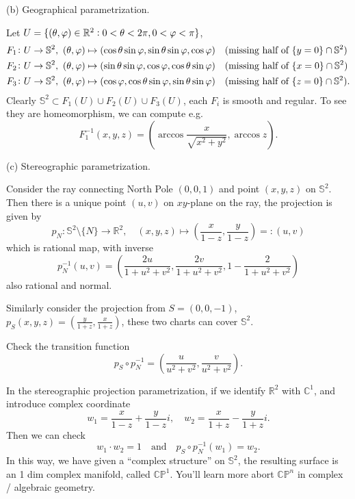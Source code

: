 \noindent (b) Geographical parametrization.

Let \(U=\{(\theta,\varphi)\in \mathbb{R}^2:0<\theta<2\pi,0<\varphi<\pi\}\), 
\begin{align*}
    &F_1\colon U\to \mathbb{S}^2,\ (\theta,\varphi)\mapsto 
    (\cos\theta\sin\varphi,\sin\theta\sin\varphi,\cos\varphi)
    \quad\text{(missing half of }\{y=0\}\cap \mathbb{S}^2\text{)}\\ 
    &F_2\colon U\to \mathbb{S}^2,\ (\theta,\varphi)\mapsto 
    (\sin\theta\sin\varphi,\cos\varphi,\cos\theta\sin\varphi)
    \quad\text{(missing half of }\{x=0\}\cap \mathbb{S}^2\text{)}\\ 
    &F_3\colon U\to \mathbb{S}^2,\ (\theta,\varphi)\mapsto 
    (\cos\varphi,\cos\theta\sin\varphi,\sin\theta\sin\varphi)
    \quad\text{(missing half of }\{z=0\}\cap \mathbb{S}^2\text{)}
.\end{align*}
Clearly \(\mathbb{S}^2\subset F_1(U)\cup F_2(U)\cup F_3(U)\), each \(F_i\) is smooth
and regular. To see they are homeomorphism, we can compute e.g. \[
    F_1^{-1}(x,y,z)=(\arccos \frac{x}{\sqrt{x^2+y^2}}, \arccos z)
.\] 

\noindent (c) Stereographic parametrization.

Consider the ray connecting North Pole \((0,0,1)\) and point \((x,y,z)\) on
\(\mathbb{S}^2\). Then there is a unique point \((u,v)\) on \(xy\)-plane on the
ray, the projection is given by \[
    p_N\colon \mathbb{S}^2\setminus\{N\}\to \mathbb{R}^2,
    \quad (x,y,z)\mapsto (\frac{x}{1-z},\frac{y}{1-z})=\colon(u,v)
\] which is rational map, with inverse \[
    p_N^{-1}(u,v)=(\frac{2u}{1+u^2+v^2},\frac{2v}{1+u^2+v^2},1-\frac{2}{1+u^2+v^2})
\] also rational and normal.

Similarly consider the projection from \(S=(0,0,-1)\), \(p_S(x,y,z)=(\frac{y}{1+z},
\frac{x}{1+z})\), these two charts can cover \(\mathbb{S}^2\).

\begin{exercise}
    Check the transition function \[
        p_S\circ p_N^{-1}=(\frac{u}{u^2+v^2},\frac{v}{u^2+v^2})
    .\] 
\end{exercise}

\begin{remark}
    In the stereographic projection parametrization, if we identify \(\mathbb{R}^2\)
    with \(\mathbb{C}^1\), and introduce complex coordinate \[
        w_1=\frac{x}{1-z}+\frac{y}{1-z}i,\quad
        w_2=\frac{x}{1+z}-\frac{y}{1+z}i
    .\] Then we can check \[
        w_1\cdot w_2=1\quad \text{and} \quad
        p_S\circ p_N^{-1}(w_1)=w_2
    .\] In this way, we have given a ``complex structure'' on \(\mathbb{S}^2\),
    the resulting surface is an 1 dim complex manifold, called \(\mathbb{CP}^1\).
    You'll learn more abort \(\mathbb{CP}^n\) in complex / algebraic geometry.
\end{remark}

